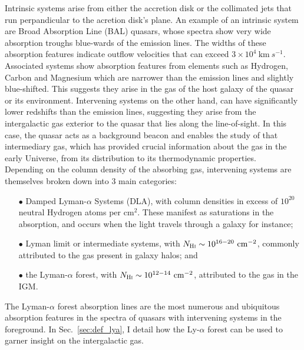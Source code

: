 Intrinsic systems arise from either the accretion disk or the collimated jets that run perpandicular to the acretion disk's plane. An example of an intrinsic system are Broad Absorption Line (BAL) quasars, whose spectra show very wide absorption troughs blue-wards of the emission lines. The widths of these absorption features indicate outflow velocities that can exceed $3 \times 10^4~\mathrm{km}~s^{-1}$. Associated systems show absorption features from elements such as Hydrogen, Carbon and Magnesium which are narrower than the emission lines and slightly blue-shifted. This suggests they arise in the gas of the host galaxy of the quasar or its environment. Intervening systems on the other hand, can have significantly lower redshifts than the emission lines, suggesting they arise from the intergalactic gas exterior to the quasar that lies along the line-of-sight. In this case, the quasar acts as a background beacon and enables the study of that intermediary gas, which has provided crucial information about the gas in the early Universe, from its distribution to its thermodynamic properties. \\

Depending on the column density of the absorbing gas, intervening systems are themselves broken down into $3$ main categories: \\

\begin{enumerate}
	\item[$\bullet$] Damped Lyman-$\alpha$ Systems (DLA), with column densities in excess of $10^{20}$ neutral Hydrogen atoms per $\mathrm{cm}^2$. These manifest as saturations in the absorption, and occurs when the light travels through a galaxy for instance; \\
	\item[$\bullet$] Lyman limit or intermediate systems, with $N_{\textsc{Hi}} \sim 10^{16-20}~ \mathrm{cm}^{-2}$, commonly attributed to the gas present in galaxy halos; and \\
	\item[$\bullet$] the Lyman-$\alpha$ forest, with $N_{\textsc{Hi}} \sim 10^{12-14}~ \mathrm{cm}^{-2}$, attributed to the gas in the IGM. \\
\end{enumerate}

The Lyman-$\alpha$ forest absorption lines are the most numerous and ubiquitous absorption features in the spectra of quasars with intervening systems in the foreground. In Sec.~\ref{sec:def_lya}, I detail how the Ly-$\alpha$ forest can be used to garner insight on the intergalactic gas.


